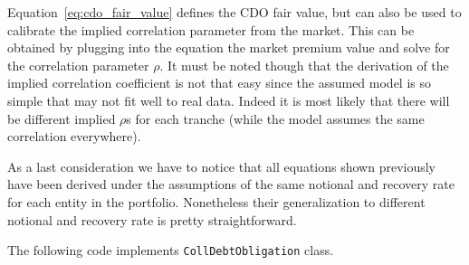 Equation~\ref{eq:cdo_fair_value} defines the CDO fair value, but can also be used to calibrate the implied correlation parameter from the market.
This can be obtained by plugging into the equation the market premium value and solve for the correlation parameter $\rho$.
It must be noted though that the derivation of the implied correlation coefficient is not that easy since the assumed model is so simple that may not fit well to real data. Indeed it is most likely that there will be different implied $\rho$s for each tranche (while the model assumes the same correlation everywhere).

As a last consideration we have to notice that all equations shown previously have been derived under the assumptions of the same notional and recovery rate for each entity in the portfolio. Nonetheless their generalization to different notional and recovery rate is pretty straightforward.
 
%

The following code implements \texttt{CollDebtObligation} class.

